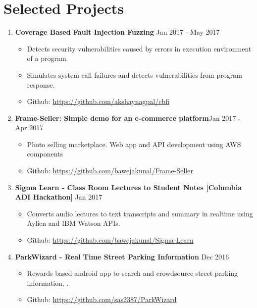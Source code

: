 \documentclass{article}
\newcommand{\bi}{\vspace{-1mm}\begin{itemize}[align=left,leftmargin=*, labelindent=0pt,labelsep=2pt, label={-}, nosep]}
\newcommand{\ei}{\end{itemize}}
\begin{document}
\section*{Selected Projects}
\begin{enumerate}

    \item \textbf{Coverage Based Fault Injection Fuzzing} {\hfill Jan 2017 - May 2017}
    \bi
        \item Detects security vulnerabilities caused by errors in execution environment of a program.
        
        \item Simulates system call failures and detects vulnerabilities from program response.
        
        \item Github: \href{https://github.com/akshaynagpal/cbfi}{https://github.com/akshaynagpal/cbfi}
    \ei

    \item \textbf{Frame-Seller: Simple demo for an e-commerce platform}{\hfill Jan 2017 - Apr 2017}
    \bi
        \item Photo selling marketplace. Web app and API development using AWS components
        
        \item Github: \href{https://github.com/bawejakunal/Frame-Seller}{https://github.com/bawejakunal/Frame-Seller}
    \ei

    \item \textbf{Sigma Learn - Class Room Lectures to Student Notes [Columbia ADI Hackathon]} {\hfill Jan 2017}
    \bi
        \item Converts audio lectures to text transcripts and summary in realtime using Aylien and IBM Watson APIs.
        
        \item Github: \href{https://github.com/bawejakunal/Sigma-Learn}{https://github.com/bawejakunal/Sigma-Learn}
    \ei

    \item \textbf{ParkWizard - Real Time Street Parking Information} {\hfill Dec 2016}
    \bi
        \item Rewards based android app to search and crowdsource street parking information, .
        
        \item Github: \href{https://github.com/sas2387/ParkWizard}{https://github.com/sas2387/ParkWizard}
    \ei


\end{enumerate}
\end{document}
